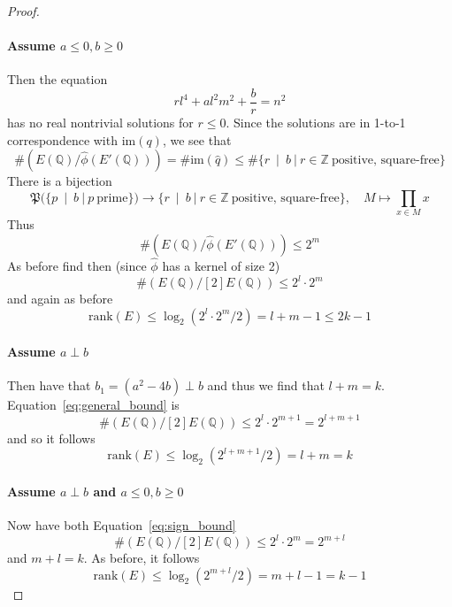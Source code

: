 \documentclass{scrartcl}
\newcommand{\Z}{\mathbb{Z}}
\newcommand{\Q}{\mathbb{Q}}
\newcommand{\im}{\mathrm{im}}
\newcommand{\divides}{\ \mid \ }
\theoremstyle{definition}
\begin{document}
\begin{proof}
    \paragraph{Assume $a \leq 0, b \geq 0$} Then the equation
    \begin{equation*}
        r l^4 + a l^2 m^2 + \frac b r = n^2
    \end{equation*}
    has no real nontrivial solutions for $r \leq 0$.
    Since the solutions are in 1-to-1 correspondence with $\im(q)$, we see that
    \begin{equation*}
        \#(E(\Q)/\hat{\phi}(E'(\Q))) = \#\im(\hat{q}) \leq \#\{ r \divides b \ | \ r \in \Z \ \text{positive, square-free} \}
    \end{equation*}
    There is a bijection
    \begin{equation*}
        \mathfrak{P}(\{ p \divides b \ | \ p \ \text{prime} \}) \to \{ r \divides b \ | \ r \in \Z \ \text{positive, square-free} \}, \quad M \mapsto \prod_{x \in M} x
    \end{equation*}
    Thus
    \begin{equation*}
        \#(E(\Q)/\hat{\phi}(E'(\Q))) \leq 2^m
    \end{equation*}
    As before find then (since $\hat{\phi}$ has a kernel of size 2)
    \begin{equation}
        \#(E(\Q)/[2]E(\Q)) \leq 2^l \cdot 2^m \label{eq:sign_bound}
    \end{equation}
    and again as before
    \begin{equation*}
        \mathrm{rank}(E) \leq \log_2(2^l \cdot 2^m / 2) = l + m - 1 \leq 2k - 1
    \end{equation*}

    \paragraph{Assume $a \perp b$} Then have that $b_1 = (a^2 - 4b) \perp b$ and thus we find that $l + m = k$.
    Equation~\ref{eq:general_bound} is
    \begin{equation*}
        \#(E(\Q)/[2]E(\Q)) \leq 2^l \cdot 2^{m + 1} = 2^{l + m + 1}
    \end{equation*}
    and so it follows
    \begin{equation*}
        \mathrm{rank}(E) \leq \log_2(2^{l + m + 1} / 2) = l + m = k
    \end{equation*}

    \paragraph{Assume $a \perp b$ and $a \leq 0, b \geq 0$} Now have both Equation~\ref{eq:sign_bound}
    \begin{equation*}
        \#(E(\Q)/[2]E(\Q)) \leq 2^l \cdot 2^m = 2^{m + l}
    \end{equation*}
    and $m + l = k$.
    As before, it follows
    \begin{equation*}
        \mathrm{rank}(E) \leq \log_2(2^{m + l} / 2) = m + l - 1 = k - 1
    \end{equation*}
\end{proof}
\end{document}
